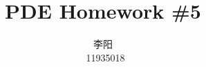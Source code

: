 \documentclass[10pt,a4paper]{article}
\title{PDE Homework \#5}
\author{\begin{CJK*}{UTF8}{gkai}
    李阳
    \end{CJK*}\, 11935018}
\begin{document}
\maketitle

\renewcommand\theenumi{\roman{enumi}}
\renewcommand\labelenumi{(\theenumi)}










\end{document}
